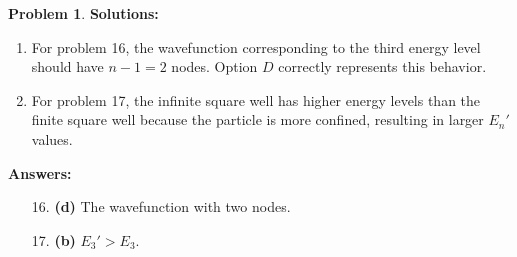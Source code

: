 \documentclass[12pt]{article}
\theoremstyle{definition} %
\newtheorem{problem}{Problem}
\theoremstyle{plain} %
\begin{document}
\begin{problem}
\textbf{Solutions:}
\begin{enumerate}
    \item For problem 16, the wavefunction corresponding to the third energy level should have \(n-1 = 2\) nodes. Option \(D\) correctly represents this behavior.
    \item For problem 17, the infinite square well has higher energy levels than the finite square well because the particle is more confined, resulting in larger \(E_n'\) values.
\end{enumerate}

\textbf{Answers:}
\begin{enumerate}
    \item[16.] \textbf{(d)} The wavefunction with two nodes.
    \item[17.] \textbf{(b)} \(E_3' > E_3\).
\end{enumerate}

\end{problem}
\end{document}
